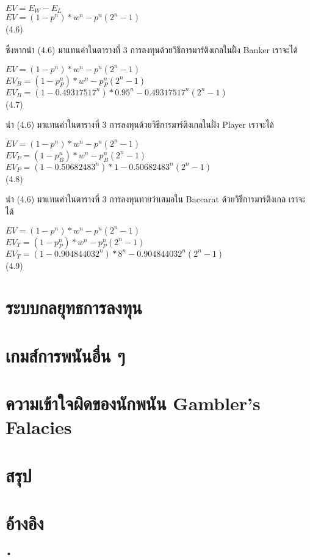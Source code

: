 \documentclass{article}
\begin{document}
\begin{center}
$EV=E_W-E_L$\\
$EV=(1-p^n)*w^n - p^n(2^n-1)$\\
(4.6)\\
\end{center}

ซึ่งหากนำ (4.6) มาแทนค่าในตารางที่ 3 การลงทุนด้วยวิธีการมาร์ติงเกลในฝั่ง Banker เราจะได้

\begin{center}
$EV=(1-p^n)*w^n - p^n(2^n-1)$\\
$EV_B=(1-p_P^n)*w^n - p_P^n(2^n-1)$\\
$EV_B=(1-0.49317517^n)*0.95^n - 0.49317517^n(2^n-1)$\\
(4.7)\\
\end{center}

นำ (4.6) มาแทนค่าในตารางที่ 3 การลงทุนด้วยวิธีการมาร์ติงเกลในฝั่ง Player เราจะได้

\begin{center}
$EV=(1-p^n)*w^n - p^n(2^n-1)$\\
$EV_P=(1-p_B^n)*w^n - p_B^n(2^n-1)$\\
$EV_P=(1-0.50682483^n)*1 - 0.50682483^n(2^n-1)$\\
(4.8)
\end{center}

นำ (4.6) มาแทนค่าในตารางที่ 3 การลงทุนทายว่าเสมอใน Baccarat ด้วยวิธีการมาร์ติงเกล เราจะได้

\begin{center}
$EV=(1-p^n)*w^n - p^n(2^n-1)$\\
$EV_T=(1-p_P^n)*w^n - p_P^n(2^n-1)$\\
$EV_T=(1-0.904844032^n)*8^n - 0.904844032^n(2^n-1)$\\
(4.9)
\end{center}

\newpage
\section{ระบบกลยุทธการลงทุน}

\newpage
\section{เกมส์การพนันอื่น ๆ}

\newpage
\section{ความเข้าใจผิดของนักพนัน Gambler's Falacies}

\newpage
\section{สรุป}

\newpage
\section{อ้างอิง}





•
\end{document}
